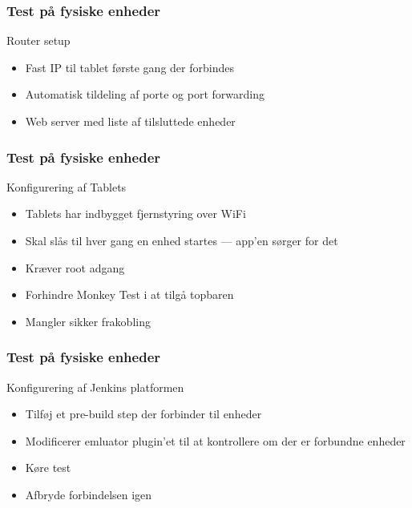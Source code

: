 \begin{frame}
    \frametitle{Test på fysiske enheder}
    Router setup
    \begin{itemize}
        \item Fast IP til tablet første gang der forbindes
        \item Automatisk tildeling af porte og port forwarding
        \item Web server med liste af tilsluttede enheder
    \end{itemize}
\end{frame}

\begin{frame}
    \frametitle{Test på fysiske enheder}
    Konfigurering af Tablets
    \begin{itemize}
        \item Tablets har indbygget fjernstyring over WiFi
        \item Skal slås til hver gang en enhed startes --- app'en sørger for det
        \item Kræver root adgang
        \item Forhindre Monkey Test i at tilgå topbaren
        \item Mangler sikker frakobling
    \end{itemize}
\end{frame}

\begin{frame}
    \frametitle{Test på fysiske enheder}
    Konfigurering af Jenkins platformen
    \begin{itemize}
        \item Tilføj et pre-build step der forbinder til enheder
        \item Modificerer emluator plugin'et til at kontrollere om der er forbundne enheder
        \item Køre test
        \item Afbryde forbindelsen igen
    \end{itemize}
\end{frame}

